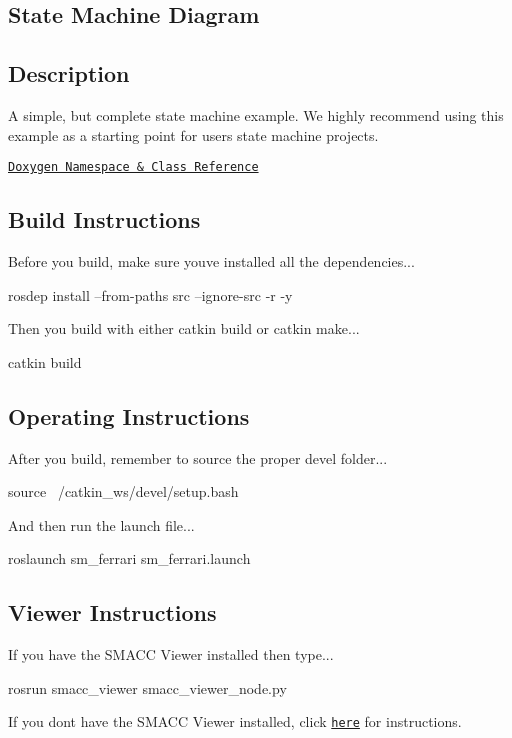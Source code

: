 \subsection*{State Machine Diagram}



\subsection*{Description}

A simple, but complete state machine example. We highly recommend using this example as a starting point for users state machine projects.~\newline


\href{https://reelrbtx.github.io/SMACC_Documentation/master/html/namespacesm__three__some.html}{\tt Doxygen Namespace \& Class Reference}

\subsection*{Build Instructions}

Before you build, make sure you\textquotesingle{}ve installed all the dependencies...


\begin{DoxyCode}
rosdep install --from-paths src --ignore-src -r -y 
\end{DoxyCode}


Then you build with either catkin build or catkin make...


\begin{DoxyCode}
catkin build
\end{DoxyCode}


\subsection*{Operating Instructions}

After you build, remember to source the proper devel folder...


\begin{DoxyCode}
source ~/catkin\_ws/devel/setup.bash
\end{DoxyCode}


And then run the launch file...


\begin{DoxyCode}
roslaunch sm\_ferrari sm\_ferrari.launch
\end{DoxyCode}


\subsection*{Viewer Instructions}

If you have the S\+M\+A\+CC Viewer installed then type...


\begin{DoxyCode}
rosrun smacc\_viewer smacc\_viewer\_node.py
\end{DoxyCode}


If you don\textquotesingle{}t have the S\+M\+A\+CC Viewer installed, click \href{http://smacc.ninja/smacc-viewer/}{\tt here} for instructions. 